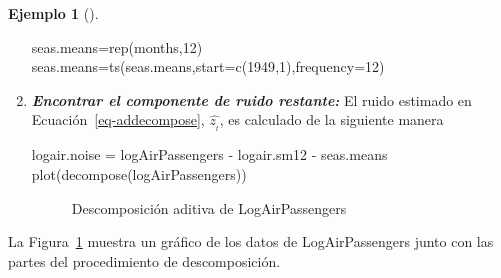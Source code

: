 \documentclass[
  us-letterpaper,
]{scrreprt}
\newenvironment{Shaded}{\begin{snugshade}}{\end{snugshade}}
\newcommand{\AttributeTok}[1]{\textcolor[rgb]{0.40,0.45,0.13}{#1}}
\newcommand{\DecValTok}[1]{\textcolor[rgb]{0.68,0.00,0.00}{#1}}
\newcommand{\FunctionTok}[1]{\textcolor[rgb]{0.28,0.35,0.67}{#1}}
\newcommand{\NormalTok}[1]{\textcolor[rgb]{0.00,0.23,0.31}{#1}}
\newcommand{\OtherTok}[1]{\textcolor[rgb]{0.00,0.23,0.31}{#1}}
\newcommand{\SpecialCharTok}[1]{\textcolor[rgb]{0.37,0.37,0.37}{#1}}
\theoremstyle{plain}
\theoremstyle{definition}
\newtheorem{example}{Ejemplo}[chapter]
\theoremstyle{plain}
\theoremstyle{definition}
\theoremstyle{remark}
\begin{document}
\begin{example}[]
\begin{tcolorbox}
\begin{enumerate}
\begin{Shaded}
\begin{Highlighting}[]
\NormalTok{seas.means}\OtherTok{=}\FunctionTok{rep}\NormalTok{(months,}\DecValTok{12}\NormalTok{)}
\NormalTok{seas.means}\OtherTok{=}\FunctionTok{ts}\NormalTok{(seas.means,}\AttributeTok{start=}\FunctionTok{c}\NormalTok{(}\DecValTok{1949}\NormalTok{,}\DecValTok{1}\NormalTok{),}\AttributeTok{frequency=}\DecValTok{12}\NormalTok{)}
\end{Highlighting}
\end{Shaded}
\item
  \textbf{\emph{Encontrar el componente de ruido restante:}} El ruido
  estimado en Ecuación~\ref{eq-addecompose}, \(\hat{z_{_t}}\), es
  calculado de la siguiente manera

\begin{Shaded}
\begin{Highlighting}[]
\NormalTok{logair.noise }\OtherTok{=}\NormalTok{ logAirPassengers }\SpecialCharTok{{-}}\NormalTok{ logair.sm12 }\SpecialCharTok{{-}}\NormalTok{ seas.means}
\FunctionTok{plot}\NormalTok{(}\FunctionTok{decompose}\NormalTok{(logAirPassengers))}
\end{Highlighting}
\end{Shaded}

  \begin{figure}[H]


  \caption{\label{fig-descadd}Descomposición aditiva de
  LogAirPassengers}

  \end{figure}%
\end{enumerate}

La Figura~\ref{fig-descadd} muestra un gráfico de los datos de
LogAirPassengers junto con las partes del procedimiento de
descomposición.

\end{tcolorbox}

\end{example}
\end{document}
